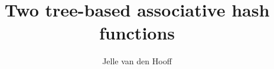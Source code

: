 \documentclass[11pt,letterpaper]{artikel3}
\begin{document}
\title{Two tree-based associative hash functions}
\author{Jelle van den Hooff}
\date{\vspace{-2ex}}
\maketitle





% 




\end{document}
